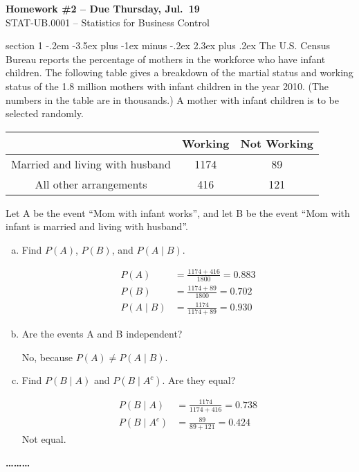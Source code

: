 \documentclass[answers,11pt]{exam}
\makeatletter
\newenvironment{problem}{\@startsection
       {section}
       {1}
       {-.2em}
       {-3.5ex plus -1ex minus -.2ex}
       {2.3ex plus .2ex}
       {\pagebreak[3]%
       \large\bf\noindent{Problem }
       }
       }
       {%
       \begin{center}\large\bf \ldots\ldots\ldots\end{center}}
\makeatother
\begin{document}
\begin{center}
  \large
  \textbf{Homework \#2 -- Due Thursday, Jul.~19} \\
  STAT-UB.0001 -- Statistics for Business Control \\
\end{center}


\thispagestyle{empty}



\begin{problem}{}
The U.S. Census Bureau reports the percentage of mothers in the workforce who have infant children.
The following table gives a breakdown of the martial status and working status of the 1.8 million mothers with infant children in the year 2010.
(The numbers in the table are in thousands.) A mother with infant children is to be selected randomly.

\begin{table}[h!]
\begin{center}
\begin{tabular}{|c|c|c|} \hline
 & Working & Not Working \\ \hline
Married and living with husband & 1174 & 89\\ \hline
All other arrangements & 416 & 121  \\ \hline
\end{tabular}
\end{center}
\end{table}

Let A be the event ``Mom with infant works'', and let B be the event ``Mom with infant is married and living with husband''.
\begin{enumerate}[(a)]
\item Find $P(A)$, $P(B)$, and $P(A\mid B)$.
\begin{solution}
\begin{align*}
P(A) &= \frac{1174+416}{1800} = 0.883\\
P(B) &= \frac{1174+89}{1800} = 0.702\\
P(A\mid B) &= \frac{1174}{1174+89} = 0.930
\end{align*}
\end{solution}
\item Are the events A and B independent?
\begin{solution}
No, because $P(A) \ne P(A\mid B)$.
\end{solution}
\item Find $P(B\mid A)$ and $P(B \mid A^c)$. Are they equal?
\begin{solution}
\begin{align*}
P(B\mid A) &= \frac{1174}{1174+416}=0.738\\
P(B\mid A^c) &= \frac{89}{89+121}=0.424
\end{align*}
Not equal.

\end{solution}
\end{enumerate}
\end{problem}
\end{document}
